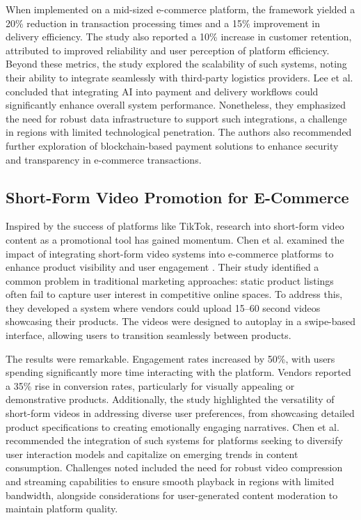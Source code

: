 \documentclass[12pt]{report}
\begin{document}
When implemented on a mid-sized e-commerce platform, the framework yielded a 20\%
reduction in transaction processing times and a 15\% improvement in delivery efficiency. The
study also reported a 10\% increase in customer retention, attributed to improved reliability
and user perception of platform efficiency. Beyond these metrics, the study explored the
scalability of such systems, noting their ability to integrate seamlessly with third-party
logistics providers. Lee et al. concluded that integrating AI into payment and delivery
workflows could significantly enhance overall system performance. Nonetheless, they
emphasized the need for robust data infrastructure to support such integrations, a challenge in
regions with limited technological penetration. The authors also recommended further
exploration of blockchain-based payment solutions to enhance security and transparency in
e-commerce transactions. \cite{c18}

\subsection*{Short-Form Video Promotion for E-Commerce}

Inspired by the success of platforms like TikTok, research into short-form video content as a
promotional tool has gained momentum. Chen et al. examined the impact of integrating
short-form video systems into e-commerce platforms to enhance product visibility and user
engagement \cite{c19}. Their study identified a common problem in traditional marketing
approaches: static product listings often fail to capture user interest in competitive online
spaces. To address this, they developed a system where vendors could upload 15–60 second
videos showcasing their products. The videos were designed to autoplay in a swipe-based
interface, allowing users to transition seamlessly between products.

The results were remarkable. Engagement rates increased by 50\%, with users spending
significantly more time interacting with the platform. Vendors reported a 35\% rise in
conversion rates, particularly for visually appealing or demonstrative products. Additionally,
the study highlighted the versatility of short-form videos in addressing diverse user
preferences, from showcasing detailed product specifications to creating emotionally
engaging narratives. Chen et al. recommended the integration of such systems for platforms
seeking to diversify user interaction models and capitalize on emerging trends in content
consumption. Challenges noted included the need for robust video compression and
streaming capabilities to ensure smooth playback in regions with limited bandwidth,
alongside considerations for user-generated content moderation to maintain platform quality. \cite{c19}
\end{document}
